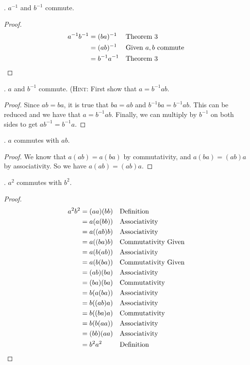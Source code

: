 \documentclass[twoside]{amsart}
\begin{document}
\begin{enumerate}[A.]
   . $a^{-1}$ and $b^{-1}$ commute.
   \begin{proof}
      \begin{align*}
         a^{-1}b^{-1} & = (ba)^{-1} && \text{Theorem 3} \\
	              & = (ab)^{-1} && \text{Given $a,b$ commute} \\
		      & = b^{-1}a^{-1} && \text{Theorem 3} \qedhere
      \end{align*}
   \end{proof}

   . $a$ and $b^{-1}$ commute. (\textsc{Hint}: First show
   that $a=b^{-1}ab$.
   \begin{proof}
   Since $ab=ba$, it is true that $ba=ab$ and $b^{-1}ba=b^{-1}ab$. This
   can be reduced and we have that $a=b^{-1}ab$. Finally, we can
   multiply by $b^{-1}$ on both sides to get $ab^{-1}=b^{-1}a$.
   \end{proof}

   . $a$ commutes with $ab$.
   \begin{proof}
   We know that $a(ab) = a(ba)$ by commutativity, and $a(ba)=(ab)a$ by
   associativity. So we have $a(ab)=(ab)a$.
   \end{proof}

   . $a^2$ commutes with $b^2$.
   \begin{proof}
      \begin{align*}
         a^2b^2 & = (aa)(bb) && \text{Definition}\\
	        & = a(a(bb)) && \text{Associativity}\\
		& = a((ab)b) && \text{Associativity}\\
		& = a((ba)b) && \text{Commutativity Given} \\
		& = a(b(ab)) && \text{Associativity} \\
		& = a(b(ba)) && \text{Commutativity Given} \\
		& = (ab)(ba) && \text{Associativity} \\
		& = (ba)(ba) && \text{Commutativity} \\
		& = b(a(ba)) && \text{Associativity} \\
		& = b((ab)a) && \text{Associativity} \\
		& = b((ba)a) && \text{Commutativity} \\
		& = b(b(aa)) && \text{Associativity} \\
		& = (bb)(aa) && \text{Associativity} \\
		& = b^2a^2   && \text{Definition} \qedhere
      \end{align*}
   \end{proof}


\end{enumerate}
\end{document}
